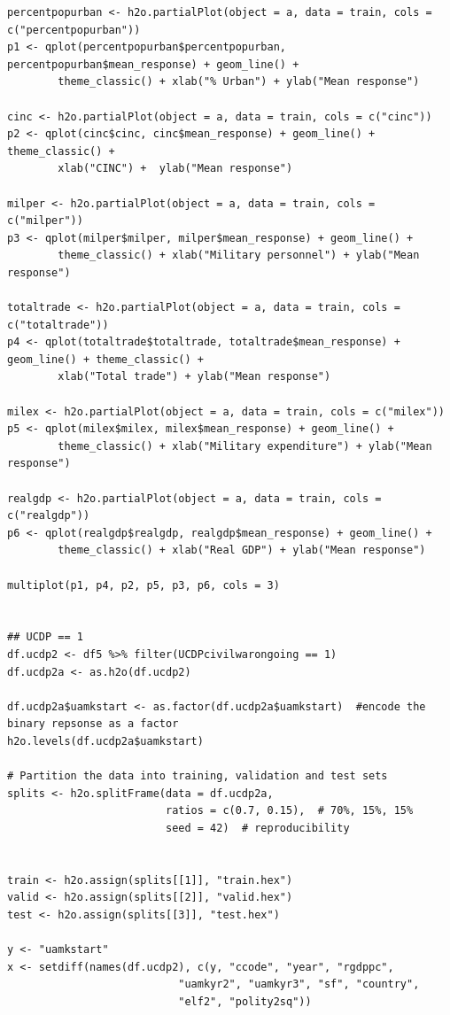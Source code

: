\documentclass[a4paper,12pt]{article}
\begin{document}
\begin{verbatim}
percentpopurban <- h2o.partialPlot(object = a, data = train, cols = c("percentpopurban"))
p1 <- qplot(percentpopurban$percentpopurban, percentpopurban$mean_response) + geom_line() +
        theme_classic() + xlab("% Urban") + ylab("Mean response")
        
cinc <- h2o.partialPlot(object = a, data = train, cols = c("cinc"))
p2 <- qplot(cinc$cinc, cinc$mean_response) + geom_line() + theme_classic() + 
        xlab("CINC") +  ylab("Mean response")

milper <- h2o.partialPlot(object = a, data = train, cols = c("milper"))
p3 <- qplot(milper$milper, milper$mean_response) + geom_line() +
        theme_classic() + xlab("Military personnel") + ylab("Mean response")

totaltrade <- h2o.partialPlot(object = a, data = train, cols = c("totaltrade"))
p4 <- qplot(totaltrade$totaltrade, totaltrade$mean_response) + geom_line() + theme_classic() +
        xlab("Total trade") + ylab("Mean response")

milex <- h2o.partialPlot(object = a, data = train, cols = c("milex"))
p5 <- qplot(milex$milex, milex$mean_response) + geom_line() +
        theme_classic() + xlab("Military expenditure") + ylab("Mean response")
        
realgdp <- h2o.partialPlot(object = a, data = train, cols = c("realgdp"))
p6 <- qplot(realgdp$realgdp, realgdp$mean_response) + geom_line() +
        theme_classic() + xlab("Real GDP") + ylab("Mean response")

multiplot(p1, p4, p2, p5, p3, p6, cols = 3)


## UCDP == 1
df.ucdp2 <- df5 %>% filter(UCDPcivilwarongoing == 1)
df.ucdp2a <- as.h2o(df.ucdp2)

df.ucdp2a$uamkstart <- as.factor(df.ucdp2a$uamkstart)  #encode the binary repsonse as a factor
h2o.levels(df.ucdp2a$uamkstart)

# Partition the data into training, validation and test sets
splits <- h2o.splitFrame(data = df.ucdp2a, 
                         ratios = c(0.7, 0.15),  # 70%, 15%, 15%
                         seed = 42)  # reproducibility


train <- h2o.assign(splits[[1]], "train.hex")   
valid <- h2o.assign(splits[[2]], "valid.hex") 
test <- h2o.assign(splits[[3]], "test.hex")

y <- "uamkstart"
x <- setdiff(names(df.ucdp2), c(y, "ccode", "year", "rgdppc",
                           "uamkyr2", "uamkyr3", "sf", "country",
                           "elf2", "polity2sq")) 


\end{verbatim}
\end{document}
